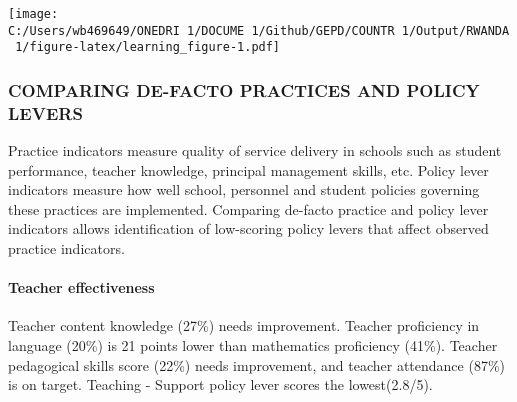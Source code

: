 \documentclass[twocolumn]{article}
\let\oldparagraph\paragraph
\renewcommand{\paragraph}[1]{\oldparagraph{#1}\mbox{}}
\begin{document}
\texttt{[image: C:/Users/wb469649/ONEDRI~1/DOCUME~1/Github/GEPD/COUNTR~1/Output/RWANDA~1/figure-latex/learning\_figure-1.pdf]}

\hypertarget{comparing-de-facto-practices-and-policy-levers}{%
\subsubsection{\texorpdfstring{\textbf{COMPARING DE-FACTO PRACTICES AND
POLICY
LEVERS}}{COMPARING DE-FACTO PRACTICES AND POLICY LEVERS}}\label{comparing-de-facto-practices-and-policy-levers}}

Practice indicators measure quality of service delivery in schools such
as student performance, teacher knowledge, principal management skills,
etc. Policy lever indicators measure how well school, personnel and
student policies governing these practices are implemented. Comparing
de-facto practice and policy lever indicators allows identification of
low-scoring policy levers that affect observed practice indicators.

\hypertarget{teacher-effectiveness}{%
\paragraph{\texorpdfstring{\textbf{Teacher
effectiveness}}{Teacher effectiveness}}\label{teacher-effectiveness}}

Teacher content knowledge (27\%) needs improvement. Teacher proficiency
in language (20\%) is 21 points lower than mathematics proficiency
(41\%). Teacher pedagogical skills score (22\%) needs improvement, and
teacher attendance (87\%) is on target. Teaching - Support policy lever
scores the lowest(2.8/5).
\end{document}
